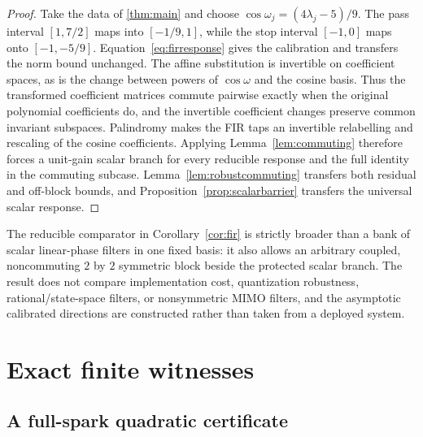 \documentclass[11pt]{article}
\theoremstyle{remark}
\begin{document}
\begin{proof}
Take the data of \cref{thm:main} and choose
$\cos\omega_j=(4\lambda_j-5)/9$.  The pass interval $[1,7/2]$ maps into
$[-1/9,1]$, while the stop interval $[-1,0]$ maps onto $[-1,-5/9]$.
Equation~\eqref{eq:firresponse} gives the calibration and transfers the norm
bound unchanged.  The affine substitution is invertible on coefficient
spaces, as is the change between powers of $\cos\omega$ and the cosine basis.
Thus the transformed coefficient matrices commute pairwise exactly when the
original polynomial coefficients do, and the invertible coefficient changes
preserve common invariant subspaces.  Palindromy makes the FIR taps an
invertible relabelling and rescaling of the cosine coefficients.  Applying
Lemma~\ref{lem:commuting} therefore forces a unit-gain scalar branch for every
reducible response and the full identity in the commuting subcase.
Lemma~\ref{lem:robustcommuting} transfers both residual and off-block bounds, and
Proposition~\ref{prop:scalarbarrier} transfers the universal scalar response.
\end{proof}

The reducible comparator in Corollary~\ref{cor:fir} is strictly broader than a
bank of scalar linear-phase filters in one fixed basis: it also allows an
arbitrary coupled, noncommuting $2$ by $2$ symmetric block beside the protected
scalar branch.  The result does not compare implementation cost, quantization
robustness, rational/state-space filters, or nonsymmetric MIMO filters, and the
asymptotic calibrated directions are constructed rather than taken from a
deployed system.

\section{Exact finite witnesses}

\subsection{A full-spark quadratic certificate}
\end{document}
